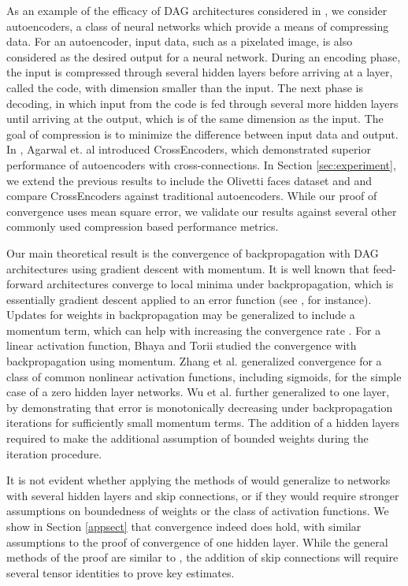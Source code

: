 \documentclass{jcmlatex}
\begin{document}
As an example of the efficacy of DAG architectures considered in \cite{huang2016densely}, we consider autoencoders, a class of neural networks which provide a means of compressing data. For an autoencoder, input data, such as a pixelated image, is also considered as the desired output for a neural network.  During an encoding phase, the input is compressed through several hidden layers before arriving at a layer, called the code, with dimension smaller than the input.  The next phase is decoding, in which input from the code is fed through several more hidden layers until arriving at the output, which is of the same dimension as the input.  The goal of compression is to minimize the difference between input data and output.  In \cite{agarwal2018crossencoder}, Agarwal et. al introduced CrossEncoders, which demonstrated superior performance of autoencoders with cross-connections. In Section \ref{sec:experiment}, we extend the previous results to include the Olivetti faces dataset and and compare  CrossEncoders against traditional autoencoders.  While our proof of convergence uses mean square error, we validate our results against several other commonly used compression based performance metrics.

Our main theoretical result is the convergence of backpropagation with DAG architectures using gradient descent with momentum.  It is well known that feed-forward architectures converge to local minima under backpropagation, which is  essentially gradient descent applied to an error function (see \cite{bishop1995neural}, for instance). Updates for weights in backpropagation may be generalized to include a momentum term, which can help with increasing the convergence rate \cite{rumelhart1987parallel}. For a linear activation function, Bhaya \cite{bhaya2004steepest} and Torii \cite{torii2002stability} studied the convergence with backpropagation using momentum. Zhang et al.\cite{zhang2006}  generalized convergence for a class of common nonlinear activation functions, including sigmoids, for the simple case of a zero hidden layer networks. Wu et al. \cite{wu2008convergence} further generalized to one layer, by demonstrating that error is monotonically decreasing under backpropagation iterations for sufficiently small momentum terms. The addition of a hidden layers required  \cite{wu2008convergence} to make the additional assumption of bounded weights during the iteration procedure.

It is not evident whether applying the methods of \cite{wu2008convergence} would generalize to networks with several hidden layers and skip connections, or if they  would require stronger assumptions on boundedness of weights or the class of activation functions.  We show in Section \ref{appsect}  that convergence indeed does hold, with similar assumptions to the proof of convergence of one hidden layer.  While the general methods of the proof are similar to \cite{wu2008convergence}, the addition of skip connections will require several tensor identities to prove key estimates.
\end{document}
